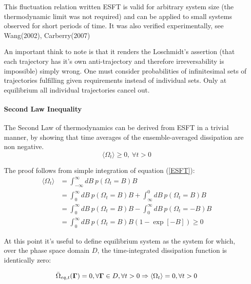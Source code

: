 \documentclass[a4paper,12pt,nofootinbib]{article}
\begin{document}
This fluctuation relation written ESFT is valid for arbitrary system size (the thermodynamic limit was not required) and can be applied to small systems observed for short periods of time.
It was also verified experimentally, see Wang(2002)\cite{Wang:2002hw}, Carberry(2007)\cite{Carberry:2007be}

An important think to note is that it renders the Loschmidt's assertion (that each trajectory has it's own anti-trajectory and therefore irreversability is impossible) simply wrong. One must consider probabilities of infinitesimal sets of trajectories fulfilling given requirements instead of individual sets. Only at equilibrium all individual trajectories cancel out.

\paragraph{Second Law Inequality}
The Second Law of thermodynamics can be derived from ESFT in a trivial manner, by showing that time averages of the ensemble-averaged dissipation are non negative.
\begin{equation}
  \langle\Omega_t\rangle\geq 0,\  \forall t > 0
\end{equation}

 The proof follows from simple integration of equation (\ref{ESFT}):
\begin{equation}
\begin{aligned}
  \langle \Omega_t \rangle &= \int_{-\infty}^{\infty} dB\ p(\Omega_t=B)B\\
  &=\int_0^{\infty} dB\ p(\Omega_t=B)B +\int_{\infty}^{0} dB\ p(\Omega_t=B)B \\
  &=\int_0^{\infty} dB\ p(\Omega_t=B)B -\int_{0}^{\infty} dB\ p(\Omega_t=-B)B \\
  &= \int_0^{\infty} dB\ p(\Omega_t=B)B(1-\exp[-B]) \geq 0 
\end{aligned}
\end{equation} 

At this point it's useful to define equilibrium system as the system for which, over the phase space domain $D$, the time-integrated dissipation function is identically zero:

\begin{equation}
  \bar{\Omega}_{eq,t}(\bm{\Gamma})=0, \forall\bm{\Gamma}\in  D, \forall t >0 \\
  \Rightarrow \langle \Omega_t \rangle = 0, \forall t > 0
\end{equation}
\end{document}
